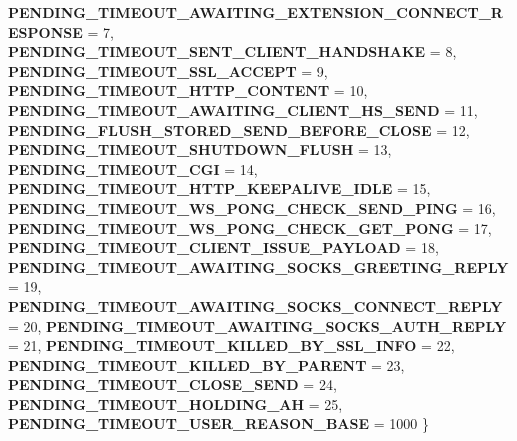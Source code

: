 \begin{DoxyCompactItemize}
{\bfseries P\+E\+N\+D\+I\+N\+G\+\_\+\+T\+I\+M\+E\+O\+U\+T\+\_\+\+A\+W\+A\+I\+T\+I\+N\+G\+\_\+\+E\+X\+T\+E\+N\+S\+I\+O\+N\+\_\+\+C\+O\+N\+N\+E\+C\+T\+\_\+\+R\+E\+S\+P\+O\+N\+SE} = 7, 
{\bfseries P\+E\+N\+D\+I\+N\+G\+\_\+\+T\+I\+M\+E\+O\+U\+T\+\_\+\+S\+E\+N\+T\+\_\+\+C\+L\+I\+E\+N\+T\+\_\+\+H\+A\+N\+D\+S\+H\+A\+KE} = 8, 
{\bfseries P\+E\+N\+D\+I\+N\+G\+\_\+\+T\+I\+M\+E\+O\+U\+T\+\_\+\+S\+S\+L\+\_\+\+A\+C\+C\+E\+PT} = 9, 
\newline
{\bfseries P\+E\+N\+D\+I\+N\+G\+\_\+\+T\+I\+M\+E\+O\+U\+T\+\_\+\+H\+T\+T\+P\+\_\+\+C\+O\+N\+T\+E\+NT} = 10, 
{\bfseries P\+E\+N\+D\+I\+N\+G\+\_\+\+T\+I\+M\+E\+O\+U\+T\+\_\+\+A\+W\+A\+I\+T\+I\+N\+G\+\_\+\+C\+L\+I\+E\+N\+T\+\_\+\+H\+S\+\_\+\+S\+E\+ND} = 11, 
{\bfseries P\+E\+N\+D\+I\+N\+G\+\_\+\+F\+L\+U\+S\+H\+\_\+\+S\+T\+O\+R\+E\+D\+\_\+\+S\+E\+N\+D\+\_\+\+B\+E\+F\+O\+R\+E\+\_\+\+C\+L\+O\+SE} = 12, 
{\bfseries P\+E\+N\+D\+I\+N\+G\+\_\+\+T\+I\+M\+E\+O\+U\+T\+\_\+\+S\+H\+U\+T\+D\+O\+W\+N\+\_\+\+F\+L\+U\+SH} = 13, 
\newline
{\bfseries P\+E\+N\+D\+I\+N\+G\+\_\+\+T\+I\+M\+E\+O\+U\+T\+\_\+\+C\+GI} = 14, 
{\bfseries P\+E\+N\+D\+I\+N\+G\+\_\+\+T\+I\+M\+E\+O\+U\+T\+\_\+\+H\+T\+T\+P\+\_\+\+K\+E\+E\+P\+A\+L\+I\+V\+E\+\_\+\+I\+D\+LE} = 15, 
{\bfseries P\+E\+N\+D\+I\+N\+G\+\_\+\+T\+I\+M\+E\+O\+U\+T\+\_\+\+W\+S\+\_\+\+P\+O\+N\+G\+\_\+\+C\+H\+E\+C\+K\+\_\+\+S\+E\+N\+D\+\_\+\+P\+I\+NG} = 16, 
{\bfseries P\+E\+N\+D\+I\+N\+G\+\_\+\+T\+I\+M\+E\+O\+U\+T\+\_\+\+W\+S\+\_\+\+P\+O\+N\+G\+\_\+\+C\+H\+E\+C\+K\+\_\+\+G\+E\+T\+\_\+\+P\+O\+NG} = 17, 
\newline
{\bfseries P\+E\+N\+D\+I\+N\+G\+\_\+\+T\+I\+M\+E\+O\+U\+T\+\_\+\+C\+L\+I\+E\+N\+T\+\_\+\+I\+S\+S\+U\+E\+\_\+\+P\+A\+Y\+L\+O\+AD} = 18, 
{\bfseries P\+E\+N\+D\+I\+N\+G\+\_\+\+T\+I\+M\+E\+O\+U\+T\+\_\+\+A\+W\+A\+I\+T\+I\+N\+G\+\_\+\+S\+O\+C\+K\+S\+\_\+\+G\+R\+E\+E\+T\+I\+N\+G\+\_\+\+R\+E\+P\+LY} = 19, 
{\bfseries P\+E\+N\+D\+I\+N\+G\+\_\+\+T\+I\+M\+E\+O\+U\+T\+\_\+\+A\+W\+A\+I\+T\+I\+N\+G\+\_\+\+S\+O\+C\+K\+S\+\_\+\+C\+O\+N\+N\+E\+C\+T\+\_\+\+R\+E\+P\+LY} = 20, 
{\bfseries P\+E\+N\+D\+I\+N\+G\+\_\+\+T\+I\+M\+E\+O\+U\+T\+\_\+\+A\+W\+A\+I\+T\+I\+N\+G\+\_\+\+S\+O\+C\+K\+S\+\_\+\+A\+U\+T\+H\+\_\+\+R\+E\+P\+LY} = 21, 
\newline
{\bfseries P\+E\+N\+D\+I\+N\+G\+\_\+\+T\+I\+M\+E\+O\+U\+T\+\_\+\+K\+I\+L\+L\+E\+D\+\_\+\+B\+Y\+\_\+\+S\+S\+L\+\_\+\+I\+N\+FO} = 22, 
{\bfseries P\+E\+N\+D\+I\+N\+G\+\_\+\+T\+I\+M\+E\+O\+U\+T\+\_\+\+K\+I\+L\+L\+E\+D\+\_\+\+B\+Y\+\_\+\+P\+A\+R\+E\+NT} = 23, 
{\bfseries P\+E\+N\+D\+I\+N\+G\+\_\+\+T\+I\+M\+E\+O\+U\+T\+\_\+\+C\+L\+O\+S\+E\+\_\+\+S\+E\+ND} = 24, 
{\bfseries P\+E\+N\+D\+I\+N\+G\+\_\+\+T\+I\+M\+E\+O\+U\+T\+\_\+\+H\+O\+L\+D\+I\+N\+G\+\_\+\+AH} = 25, 
\newline
{\bfseries P\+E\+N\+D\+I\+N\+G\+\_\+\+T\+I\+M\+E\+O\+U\+T\+\_\+\+U\+S\+E\+R\+\_\+\+R\+E\+A\+S\+O\+N\+\_\+\+B\+A\+SE} = 1000
 \}
\end{DoxyCompactItemize}
